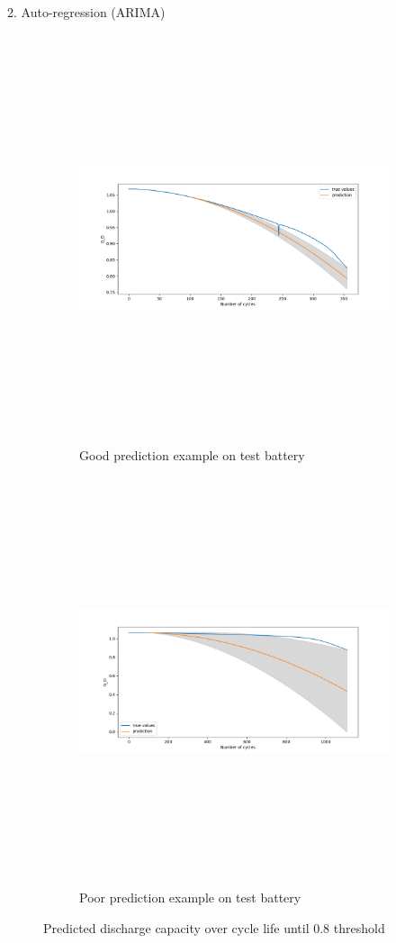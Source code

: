 \documentclass[final]{beamer}
\newlength{\colwidth}
\begin{document}
\begin{frame}[t]
\begin{columns}[t]
\begin{column}{\colwidth}
\begin{block}{2. Auto-regression (ARIMA)}
    \begin{figure}[H]
     \centering
     \begin{subfigure}[b]{0.5\textwidth}
         \centering
         \includegraphics[width=\colwidth/2,height = 12cm]{figs/best fit 100.png}
         \caption{Good prediction example on test battery}
     \end{subfigure}
     \hfill
     \begin{subfigure}[b]{0.49\textwidth}
        \centering
        \includegraphics[width=\colwidth/2,height = 12cm]{figs/worst fit 100.png}
         \caption{Poor prediction example on test battery}
     \end{subfigure}
\caption{Predicted discharge capacity over cycle life until 0.8 threshold} %
\label{fig:birds}
\end{figure} 


\end{block}
\end{column}
\end{columns}
\end{frame}
\end{document}
